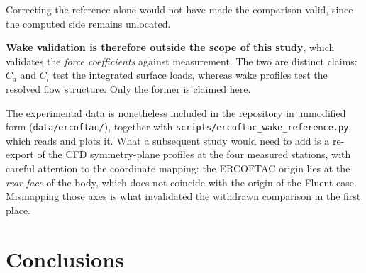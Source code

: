 \documentclass[12pt,a4paper]{article}
\begin{document}
Correcting the reference alone would not have made the comparison valid, since the computed side
remains unlocated.

\textbf{Wake validation is therefore outside the scope of this study}, which validates the
\emph{force coefficients} against measurement. The two are distinct claims: $C_d$ and $C_l$ test the
integrated surface loads, whereas wake profiles test the resolved flow structure. Only the former is
claimed here.

The experimental data is nonetheless included in the repository in unmodified form
(\texttt{data/ercoftac/}), together with \texttt{scripts/ercoftac\_wake\_reference.py}, which reads
and plots it. What a subsequent study would need to add is a re-export of the CFD symmetry-plane
profiles at the four measured stations, with careful attention to the coordinate mapping: the
ERCOFTAC origin lies at the \emph{rear face} of the body, which does not coincide with the origin of
the Fluent case. Mismapping those axes is what invalidated the withdrawn comparison in the first
place.

\section{Conclusions}
\end{document}
